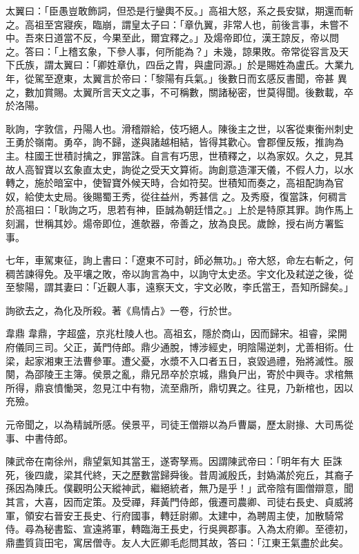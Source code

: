 \begin{pinyinscope}
 太翼曰：「臣愚豈敢飾詞，但恐是行鑾輿不反。」高祖大怒，系之長安獄，期還而斬之。高祖至宮寢疾，臨崩，謂皇太子曰：「章仇翼，非常人也，前後言事，未嘗不中。吾來日道當不反，今果至此，爾宜釋之。」及煬帝即位，漢王諒反，帝以問之。答曰：「上稽玄象，下參人事，何所能為？」未幾，諒果敗。帝常從容言及天下氏族，謂太翼曰：「卿姓章仇，四岳之胄，與盧同源。」於是賜姓為盧氏。大業九年，從駕至遼東，太翼言於帝曰：「黎陽有兵氣。」後數日而玄感反書聞，帝甚
 異之，數加賞賜。太翼所言天文之事，不可稱數，關諸秘密，世莫得聞。後數載，卒於洛陽。



 耿詢，字敦信，丹陽人也。滑稽辯給，伎巧絕人。陳後主之世，以客從東衡州刺史王勇於嶺南。勇卒，詢不歸，遂與諸越相結，皆得其歡心。會郡俚反叛，推詢為主。柱國王世積討擒之，罪當誅。自言有巧思，世積釋之，以為家奴。久之，見其故人高智寶以玄象直太史，詢從之受天文算術。詢創意造渾天儀，不假人力，以水轉之，施於暗室中，使智寶外候天時，合如符契。世積知而奏之，高祖配詢為官奴，給使太史局。後賜蜀王秀，從往益州，秀甚信
 之。及秀廢，復當誅，何稠言於高祖曰：「耿詢之巧，思若有神，臣誠為朝廷惜之。」上於是特原其罪。詢作馬上刻漏，世稱其妙。煬帝即位，進欹器，帝善之，放為良民。歲餘，授右尚方署監事。



 七年，車駕東征，詢上書曰：「遼東不可討，師必無功。」帝大怒，命左右斬之，何稠苦諫得免。及平壤之敗，帝以詢言為中，以詢守太史丞。宇文化及弒逆之後，從至黎陽，謂其妻曰：「近觀人事，遠察天文，宇文必敗，李氏當王，吾知所歸矣。」



 詢欲去之，為化及所殺。著《鳥情占》一卷，行於世。



 韋鼎
 韋鼎，字超盛，京兆杜陵人也。高祖玄，隱於商山，因而歸宋。祖睿，梁開府儀同三司。父正，黃門侍郎。鼎少通脫，博涉經史，明陰陽逆刺，尤善相術。仕梁，起家湘東王法曹參軍。遭父憂，水漿不入口者五日，哀毀過禮，殆將滅性。服闋，為邵陵王主簿。侯景之亂，鼎兄昂卒於京城，鼎負尸出，寄於中興寺。求棺無所得，鼎哀憤慟哭，忽見江中有物，流至鼎所，鼎切異之。往見，乃新棺也，因以充殮。



 元帝聞之，以為精誠所感。侯景平，司徒王僧辯以為戶曹屬，歷太尉掾、大司馬從事、中書侍郎。



 陳武帝在南徐州，鼎望氣知其當王，遂寄孥焉。因謂陳武帝曰：「明年有大
 臣誅死，後四歲，梁其代終，天之歷數當歸舜後。昔周滅殷氏，封媯滿於宛丘，其裔子孫因為陳氏。僕觀明公天縱神武，繼絕統者，無乃是乎！」武帝陰有圖僧辯意，聞其言，大喜，因而定策。及受禪，拜黃門侍郎，俄遷司農卿、司徒右長史、貞威將軍，領安右晉安王長史、行府國事，轉廷尉卿。太建中，為聘周主使，加散騎常侍。尋為秘書監、宣遠將軍，轉臨海王長史，行吳興郡事。入為太府卿。至德初，鼎盡質貨田宅，寓居僧寺。友人大匠卿毛彪問其故，答曰：「江東王氣盡於此矣。




\end{pinyinscope}
